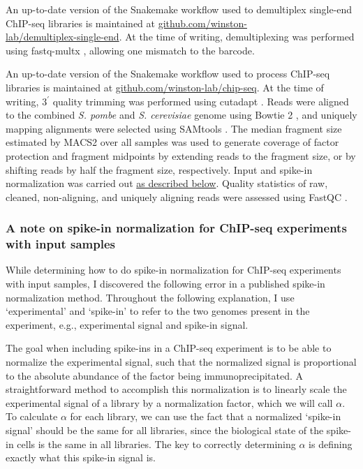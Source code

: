 An up-to-date version of the Snakemake \citep{koster2012} workflow used to demultiplex single-end ChIP-seq libraries is maintained at \href{https://github.com/winston-lab/demultiplex-single-end}{github.com/winston-\\lab/demultiplex-single-end}.
At the time of writing, demultiplexing was performed using fastq-multx \citep{aronesty2013}, allowing one mismatch to the barcode.

An up-to-date version of the Snakemake \citep{koster2012} workflow used to process ChIP-seq libraries is maintained at \href{https://github.com/winston-lab/chip-seq}{github.com/winston-lab/chip-seq}.
At the time of writing, 3$^\prime$ quality trimming was performed using cutadapt \citep{martin2011}.
Reads were aligned to the combined \textit{S. pombe} and \textit{S. cerevisiae} genome using Bowtie 2 \citep{langmead2012}, and uniquely mapping alignments were selected using SAMtools \citep{li2009}.
The median fragment size estimated by MACS2 \citep{zhang2008} over all samples was used to generate coverage of factor protection and fragment midpoints by extending reads to the fragment size, or by shifting reads by half the fragment size, respectively.
Input and spike-in normalization was carried out \hyperref[subsubsec:chip_spikein]{as described below}.
Quality statistics of raw, cleaned, non-aligning, and uniquely aligning reads were assessed using FastQC \citep{andrews2010}.

\subsubsection{A note on spike-in normalization for ChIP-seq experiments with input samples}
\label{subsubsec:chip_spikein}

While determining how to do spike-in normalization for ChIP-seq experiments with input samples, I discovered the following error in a published spike-in normalization method.
Throughout the following explanation, I use `experimental' and `spike-in' to refer to the two genomes present in the experiment, e.g., experimental signal and spike-in signal.

The goal when including spike-ins in a ChIP-seq experiment is to be able to normalize the experimental signal, such that the normalized signal is proportional to the absolute abundance of the factor being immunoprecipitated.
A straightforward method to accomplish this normalization is to linearly scale the experimental signal of a library by a normalization factor, which we will call $\alpha$.
To calculate $\alpha$ for each library, we can use the fact that a normalized `spike-in signal' should be the same for all libraries, since the biological state of the spike-in cells is the same in all libraries.
The key to correctly determining $\alpha$ is defining exactly what this spike-in signal is.

